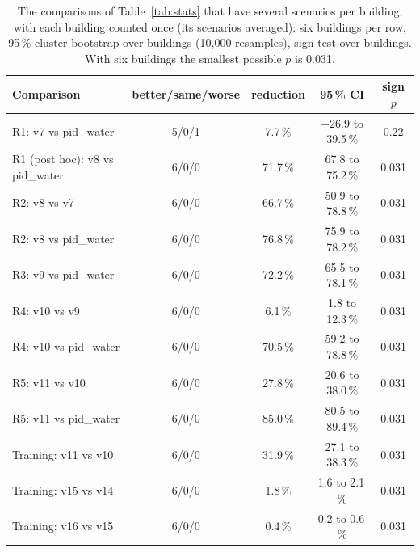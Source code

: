 \documentclass{article}
\begin{document}
\begin{table}[!htb]\centering
\caption{The comparisons of Table~\ref{tab:stats} that have several scenarios per building, with each building counted once (its scenarios averaged): six buildings per row, 95\,\% cluster bootstrap over buildings (10{,}000 resamples), sign test over buildings. With six buildings the smallest possible $p$ is 0.031.}\label{tab:statsb}
\small
\begin{tabular}{lcccc}\toprule
Comparison & better/same/worse & reduction & 95\,\% CI & sign $p$\\\midrule
R1: v7 vs pid\_water & 5/0/1 & 7.7\,\% & $-26.9$ to 39.5\,\% & 0.22\\
R1 (post hoc): v8 vs pid\_water & 6/0/0 & 71.7\,\% & 67.8 to 75.2\,\% & 0.031\\
R2: v8 vs v7 & 6/0/0 & 66.7\,\% & 50.9 to 78.8\,\% & 0.031\\
R2: v8 vs pid\_water & 6/0/0 & 76.8\,\% & 75.9 to 78.2\,\% & 0.031\\
R3: v9 vs pid\_water & 6/0/0 & 72.2\,\% & 65.5 to 78.1\,\% & 0.031\\
R4: v10 vs v9 & 6/0/0 & 6.1\,\% & 1.8 to 12.3\,\% & 0.031\\
R4: v10 vs pid\_water & 6/0/0 & 70.5\,\% & 59.2 to 78.8\,\% & 0.031\\
R5: v11 vs v10 & 6/0/0 & 27.8\,\% & 20.6 to 38.0\,\% & 0.031\\
R5: v11 vs pid\_water & 6/0/0 & 85.0\,\% & 80.5 to 89.4\,\% & 0.031\\
Training: v11 vs v10 & 6/0/0 & 31.9\,\% & 27.1 to 38.3\,\% & 0.031\\
Training: v15 vs v14 & 6/0/0 & 1.8\,\% & 1.6 to 2.1\,\% & 0.031\\
Training: v16 vs v15 & 6/0/0 & 0.4\,\% & 0.2 to 0.6\,\% & 0.031\\\bottomrule
\end{tabular}
\end{table}
\end{document}
